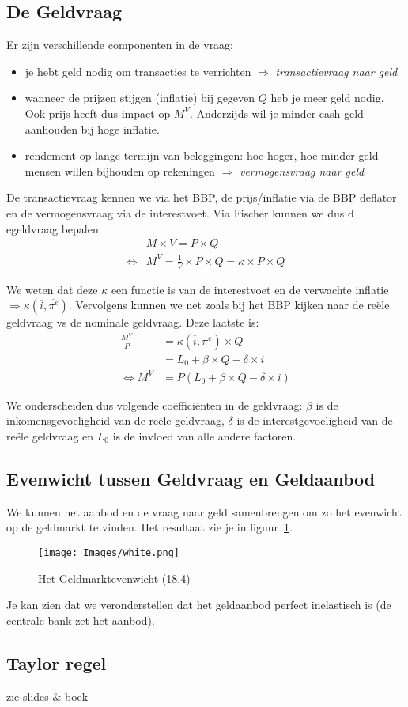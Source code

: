 \subsection{De Geldvraag}
\label{sub:De Geldvraag}
Er zijn verschillende componenten in de vraag:
\begin{itemize}
  \item je hebt geld nodig om transacties te verrichten $\Rightarrow$ \textit{transactievraag naar geld}
  \item wanneer de prijzen stijgen (inflatie) bij gegeven $Q$ heb je meer geld nodig. Ook prijs heeft dus impact op $M^V$. Anderzijds wil je minder cash geld aanhouden bij hoge inflatie.
  \item rendement op lange termijn van beleggingen: hoe hoger, hoe minder geld mensen willen bijhouden op rekeningen $\Rightarrow$ \textit{vermogensvraag naar geld}
\end{itemize}

De transactievraag kennen we via het BBP, de prijs/inflatie via de BBP deflator en de vermogensvraag via de interestvoet. Via Fischer kunnen we dus d egeldvraag bepalen:
\begin{align}
  &M \times V = P \times Q \\
  \Leftrightarrow &M^V = \frac{1}{V} \times P \times Q = \kappa \times P \times Q
\end{align}

We weten dat deze $\kappa$ een functie is van de interestvoet en de verwachte inflatie $\Rightarrow \kappa(\overline{i}, \overline{\pi^e})$. Vervolgens kunnen we net zoals bij het BBP kijken naar de re\"ele geldvraag vs de nominale geldvraag. Deze laatste is:
\begin{align}
  \frac{M^V}{P} &= \kappa(\overline{i}, \overline{\pi^e}) \times Q \\
  &= L_0 + \beta \times Q - \delta \times i \\
  \Leftrightarrow M^V &= P (L_0 + \beta \times Q - \delta \times i)
\end{align}

We onderscheiden dus volgende co\"effici\"enten in de geldvraag: $\beta$ is de inkomensgevoeligheid van de re\"ele geldvraag, $\delta$ is de interestgevoeligheid van de re\"ele geldvraag en $L_0$ is de invloed van alle andere factoren.

\subsection{Evenwicht tussen Geldvraag en Geldaanbod}
\label{sub:Evenwicht tussen Geldvraag en Geldaanbod}
We kunnen het aanbod en de vraag naar geld samenbrengen om zo het evenwicht op de geldmarkt te vinden. Het resultaat zie je in figuur~\ref{fig:geldmarktevenwicht}.
\begin{figure}[htbp]
  \centering
  \texttt{[image: Images/white.png]}
  \caption{Het Geldmarktevenwicht (18.4)}
  \label{fig:geldmarktevenwicht}
\end{figure}
Je kan zien dat we veronderstellen dat het geldaanbod perfect inelastisch is (de centrale bank zet het aanbod).

\subsection{Taylor regel}
\label{sub:Taylor regel}
zie slides \& boek
